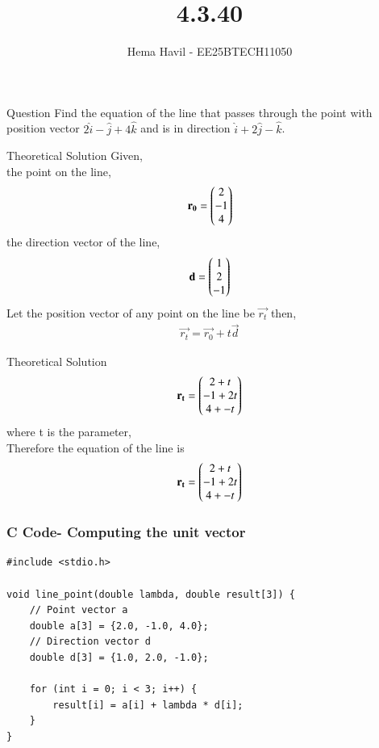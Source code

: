 \documentclass{beamer}
\title %
{4.3.40}
\author %
{Hema Havil - EE25BTECH11050}
\begin{document}
	
	\frame{\titlepage}
	\begin{frame}{Question}
		 Find the equation of the line that passes through the point with position vector
        $2\hat{i}-\hat{j}+4\hat{k}$ and is in direction $\hat{i}+2\hat{j}-\hat{k}$.
	\end{frame}

	
\begin{frame}{Theoretical Solution}
	Given,\\
         the point on the line,
         \begin{align}
             \mathbf{r_0}=\begin{pmatrix}2\\-1\\4\end{pmatrix}
         \end{align}
         the direction vector of the line,
         \begin{align}
             \mathbf{d}=\begin{pmatrix}1\\2\\-1\end{pmatrix}
         \end{align}
         Let the position vector of any point on the line be $\vec{r_t}$ then,
         \begin{align}
             \vec{r_t}=\vec{r_0}+t\vec{d}
         \end{align}
\end{frame}
\begin{frame}{Theoretical Solution}
\begin{align}
             \mathbf{r_t}=\begin{pmatrix}2+t\\-1+2t\\4+-t\end{pmatrix}
         \end{align}
         where t is the parameter,\\
         Therefore the equation of the line is 
         \begin{align}
             \mathbf{r_t}=\begin{pmatrix}2+t\\-1+2t\\4+-t\end{pmatrix}
         \end{align}
\end{frame}
	
	\begin{frame}[fragile]
	\frametitle{C Code- Computing the unit vector}
	
	\begin{lstlisting}
#include <stdio.h>

void line_point(double lambda, double result[3]) {
    // Point vector a
    double a[3] = {2.0, -1.0, 4.0};
    // Direction vector d
    double d[3] = {1.0, 2.0, -1.0};

    for (int i = 0; i < 3; i++) {
        result[i] = a[i] + lambda * d[i];
    }
}

	\end{lstlisting}
\end{frame}
\end{document}
